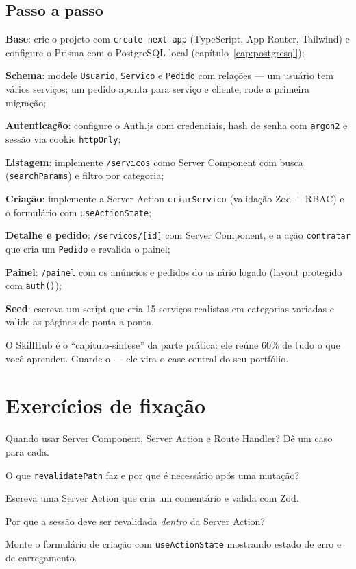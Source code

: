 \subsection{Passo a passo}

\begin{passos}
  \item \textbf{Base}: crie o projeto com \texttt{create-next-app} (TypeScript,
  App Router, Tailwind) e configure o Prisma com o PostgreSQL local
  (capítulo~\ref{cap:postgresql});
  \item \textbf{Schema}: modele \texttt{Usuario}, \texttt{Servico} e
  \texttt{Pedido} com relações — um usuário tem vários serviços; um pedido
  aponta para serviço e cliente; rode a primeira migração;
  \item \textbf{Autenticação}: configure o Auth.js com credenciais, hash de
  senha com \texttt{argon2} e sessão via cookie \texttt{httpOnly};
  \item \textbf{Listagem}: implemente \texttt{/servicos} como Server Component
  com busca (\texttt{searchParams}) e filtro por categoria;
  \item \textbf{Criação}: implemente a Server Action \texttt{criarServico}
  (validação Zod + RBAC) e o formulário com \texttt{useActionState};
  \item \textbf{Detalhe e pedido}: \texttt{/servicos/[id]} com Server
  Component, e a ação \texttt{contratar} que cria um \texttt{Pedido} e
  revalida o painel;
  \item \textbf{Painel}: \texttt{/painel} com os anúncios e pedidos do usuário
  logado (layout protegido com \texttt{auth()});
  \item \textbf{Seed}: escreva um script que cria 15 serviços realistas em
  categorias variadas e valide as páginas de ponta a ponta.
\end{passos}

\begin{caixadica}
O SkillHub é o ``capítulo-síntese'' da parte prática: ele reúne 60\% de tudo
o que você aprendeu. Guarde-o — ele vira o case central do seu portfólio.
\end{caixadica}

\section{Exercícios de fixação}

\begin{exercicios}
  \item Quando usar Server Component, Server Action e Route Handler? Dê um caso para cada.
  \item O que \texttt{revalidatePath} faz e por que é necessário após uma mutação?
  \item Escreva uma Server Action que cria um comentário e valida com Zod.
  \item Por que a sessão deve ser revalidada \emph{dentro} da Server Action?
  \item Monte o formulário de criação com \texttt{useActionState} mostrando estado de erro e de carregamento.
\end{exercicios}

